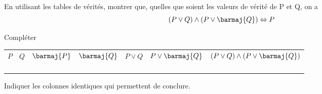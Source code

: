\begin{exercice}
	En utilisant les tables de vérités, montrer que, quelles que soient les valeurs de vérité de P et Q, on a $$(P\vee Q)\wedge (P\vee \barmaj{Q})\Leftrightarrow P$$
	
	Compléter
	
	\begin{center}
		\tabstyled
		\begin{tabular}{|c|c|c|c|c|c|c|}
			
			\ccell $P$ & \ccell $Q$ & \ccell$\barmaj{P}$ & \ccell$\barmaj{Q}$ & \ccell$P \vee Q$ & \ccell$P\vee \barmaj{Q}$ & \ccell$(P\vee Q)\wedge (P\vee \barmaj{Q})$ \\
			
			         &          &                    &                    &                  &                          &                                            \\
			
			         &          &                    &                    &                  &                          &                                            \\
			
			         &          &                    &                    &                  &                          &                                            \\
			
			         &          &                    &                    &                  &                          &                                            \\
		\end{tabular}
	\end{center}
	Indiquer les colonnes identiques qui permettent de conclure.
\end{exercice}

